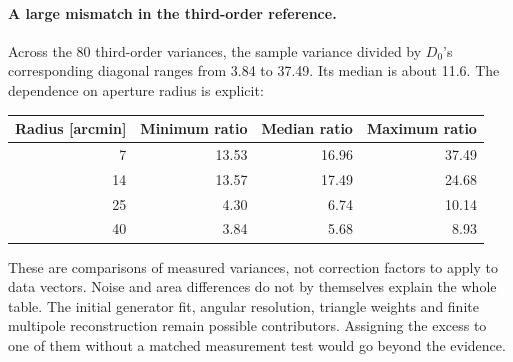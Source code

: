 \documentclass[11pt]{article}
\begin{document}
\paragraph{A large mismatch in the third-order reference.}
Across the 80 third-order variances, the sample variance divided by
$D_0$'s corresponding diagonal ranges from 3.84 to 37.49. Its median is
about 11.6. The dependence on aperture radius is explicit:
\begin{center}
\begin{tabular}{rrrr}
\toprule
Radius [arcmin]&Minimum ratio&Median ratio&Maximum ratio\\
\midrule
7 &13.53&16.96&37.49\\
14&13.57&17.49&24.68\\
25&4.30&6.74&10.14\\
40&3.84&5.68&8.93\\
\bottomrule
\end{tabular}
\end{center}
These are comparisons of measured variances, not correction factors to
apply to data vectors. Noise and area differences do not by themselves
explain the whole table. The initial generator fit, angular resolution,
triangle weights and finite multipole reconstruction remain possible
contributors. Assigning the excess to one of them without a matched
measurement test would go beyond the evidence.
\end{document}

